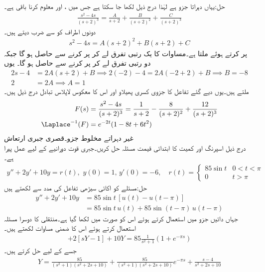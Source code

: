 حل:یہاں  دہراتا جزو ہے لہٰذا درج ذیل لکھا جا سکتا ہے جس میں ،  اور  معلوم کرنا باقی ہے۔
\begin{align*}
\frac{s^2-4s}{(s+2)^3}=\frac{A}{s+2}+\frac{B}{(s+2)^2}+\frac{C}{(s+2)^3}
\end{align*}
دونوں اطراف کو  سے ضرب دیتے ہیں۔
\begin{align*}
s^2-4s=A(s+2)^2+B(s+2)+C
\end{align*}
 پر کرتے ہوئے  ملتا ہے۔مساوات کا یک رتبی تفرق لے کر  پر کرنے سے  حاصل ہو گا جبکہ دو رتبی تفرق لے کر  پر کرنے سے  حاصل ہو گا۔ یوں
\begin{align*}
2s-4&=2A(s+2)+B \implies  2(-2)-4=2A(-2+2)+B \implies  B=-8\\
2&=2A\implies  A=1
\end{align*}
ملتے ہیں۔یوں دیے گئے تفاعل کا جزوی کسری پھیلاو  اور اس کا معکوس لاپلاس تبادل درج ذیل ہیں۔
\begin{align*}
F(s)&=\frac{s^2-4s}{(s+2)^3}=\frac{1}{s+2}-\frac{8}{(s+2)^2}+\frac{12}{(s+2)^3}\\
\Laplace^{-1}(F)&=e^{-2t}(1-8t+6t^2)
\end{align*}
\quad غیر دہراتے مخلوط جزو۔قصری جبری ارتعاش\\
درج ذیل اسپرنگ اور کمیت کا ابتدائی قیمت مسئلہ حل کریں۔جبری قوت  دورانیے کے لیے عمل پیرا ہے۔
\begin{align*}
y''+2y'+10y=r(t), \,\,y(0)=1, \, y'(0)=-6,\quad r(t)=
\begin{cases}
85\sin t & 0<t<\pi\\
0&t>\pi
\end{cases}
\end{align*}
حل:مسئلے کو اکائی سیڑھی تفاعل کی مدد سے لکھتے ہیں
\begin{align*}
y''+2y'+10y&=85 \sin t\, [u(t)-u(t-\pi)] \\
&=85 \sin t \,u(t)+85\sin(t-\pi)\, u(t-\pi)
\end{align*}
جہاں دائیں جزو میں  استعمال کرتے ہوئے اس کو  صورت میں لکھا گیا ہے۔منتقلی کا دوسرا مسئلہ استعمال کرتے ہوئے اس کا ضمنی مساوات لکھتے ہیں۔
\begin{align*}
[s^2Y-s(1)+6]+2[sY-1]+10Y=85\frac{1}{s^2+1}(1+e^{-\pi s})
\end{align*}
جسے   کے لیے حل کرتے ہیں۔
\begin{align}\label{مساوات_مثال_لاپلاس_نصف_لہر_الف}
Y=\frac{85}{(s^2+1)(s^2+2s+10)}+\frac{85}{(s^2+1)(s^2+2s+10)}e^{-\pi s}+\frac{s-4}{s^2+2s+10}
\end{align}

